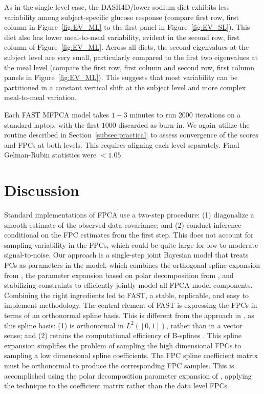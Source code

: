 \documentclass[12pt]{article}
\begin{document}
As in the single level case, the DASH4D/lower sodium diet exhibits less variability among subject-specific glucose response (compare first row, first column in Figure~\ref{fig:EV_ML} to the first panel in Figure~\ref{fig:EV_SL}). This diet also has lower meal-to-meal variability, evident in the second row, first column of Figure~\ref{fig:EV_ML}. Across all diets, the second eigenvalues at the subject level are very small, particularly compared to the first two eigenvalues at the meal level (compare the first row, first column and second row, first column panels in Figure~\ref{fig:EV_ML}). This suggests that most variability can be partitioned in a constant vertical shift at the subject level and more complex meal-to-meal variation.

Each FAST MFPCA model takes $1-3$ minutes to run $2000$ iterations on a standard laptop, with the first $1000$ discarded as burn-in. We again utilize the routine described in Section~\ref{subsec:practical} to assess convergence of the scores and FPCs at both levels. This requires aligning each level separately. Final Gelman-Rubin statistics were $< 1.05$. 

\section{Discussion}\label{sec:discussion}

Standard implementations of FPCA use a two-step procedure: (1) diagonalize  a smooth estimate of the observed data covariance; and (2) conduct inference conditional on the FPC estimates from the first step. This does not account for sampling variability in the FPCs, which could be quite large for low to moderate  signal-to-noise. Our approach is a single-step joint Bayesian model that treats PCs as parameters in the model, which combines the orthogonal spline expansion from \cite{ye_functional_2024}, the parameter expansion  based on polar decomposition from \cite{jauch_monte_2021}, and stabilizing constraints to efficiently jointly model all FPCA model components. Combining the right ingredients led to FAST, a stable, replicable, and easy to implement methodology. The central element of FAST is expressing the FPCs in terms of an orthonormal spline basis. This is different from the approach in \cite{ye_functional_2024}, as this spline basis: (1) is orthonormal in $L^2([0,1])$, rather than in a vector sense; and (2) retains the computational efficiency of B-splines \citep{liu_splinets_2020}. This spline expansion simplifies the problem of sampling the high dimensional FPCs to sampling a low dimensional spline coefficients.
The FPC spline coefficient matrix must be orthonormal to produce the corresponding FPC samples. This is accomplished using the polar decomposition parameter expansion of \cite{jauch_monte_2021}, applying the technique to the coefficient matrix rather than the data level FPCs.
\end{document}
